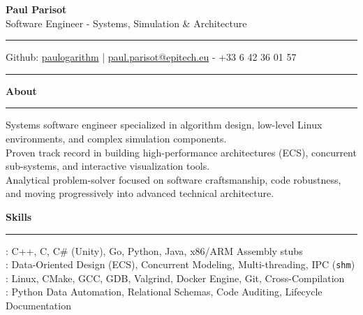 \documentclass[9pt]{extarticle}
\begin{document}
\begin{center}
    {\huge\bfseries Paul Parisot} %
    \\[10pt]
    {\Large Software Engineer - Systems, Simulation \& Architecture}
    \\
\end{center}

\par\vspace{-10pt}
\rule{\linewidth}{0.4pt}
\par\vspace{-10pt}

\begin{center}
    Github: \href{https://github.com/paulogarithm}{paulogarithm} %
    \quad | \quad 
    \href{mailto:paul.parisot@epitech.eu}{paul.parisot@epitech.eu} - +33 6 42 36 01 57 %
\end{center}

\par\vspace{-15pt}
\rule{\linewidth}{0.4pt}
\par\vspace{5pt}

{\large\bfseries About}
\par\vspace{-8pt}
\rule{\linewidth}{0.4pt}
\par\vspace{5pt}

Systems software engineer specialized in algorithm design, low-level Linux environments, and complex simulation components. \\
Proven track record in building high-performance architectures (ECS), concurrent sub-systems, and interactive visualization tools. \\
Analytical problem-solver focused on software craftsmanship, code robustness, and moving progressively into advanced technical architecture.

\par\vspace{5pt}

{\large\bfseries Skills}
\par\vspace{-8pt}
\rule{\linewidth}{0.4pt}
\par\vspace{5pt}

\hspace*{5pt}{\bfseries Core Programming}: C++, C, C\# (Unity), Go, Python, Java, x86/ARM Assembly stubs \\
\hspace*{5pt}{\bfseries Systems \& Modeling}: Data-Oriented Design (ECS), Concurrent Modeling, Multi-threading, IPC (\texttt{shm}) \\
\hspace*{5pt}{\bfseries Tooling \& Infrastructure}: Linux, CMake, GCC, GDB, Valgrind, Docker Engine, Git, Cross-Compilation \\
\hspace*{5pt}{\bfseries Data \& Automation}: Python Data Automation, Relational Schemas, Code Auditing, Lifecycle Documentation
\end{document}
